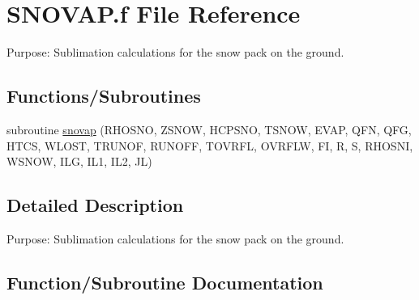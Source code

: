 \hypertarget{SNOVAP_8f}{}\section{S\+N\+O\+V\+A\+P.\+f File Reference}
\label{SNOVAP_8f}


Purpose\+: Sublimation calculations for the snow pack on the ground.  


\subsection*{Functions/\+Subroutines}
\begin{DoxyCompactItemize}
\item 
subroutine \hyperlink{SNOVAP_8f_a64f8b35d4ad3e8ced53867425e4500d3}{snovap} (R\+H\+O\+S\+N\+O, Z\+S\+N\+O\+W, H\+C\+P\+S\+N\+O, T\+S\+N\+O\+W, E\+V\+A\+P, Q\+F\+N, Q\+F\+G, H\+T\+C\+S, W\+L\+O\+S\+T, T\+R\+U\+N\+O\+F, R\+U\+N\+O\+F\+F, T\+O\+V\+R\+F\+L, O\+V\+R\+F\+L\+W, F\+I, R, S, R\+H\+O\+S\+N\+I, W\+S\+N\+O\+W, I\+L\+G, I\+L1, I\+L2, J\+L)
\end{DoxyCompactItemize}


\subsection{Detailed Description}
Purpose\+: Sublimation calculations for the snow pack on the ground. 



\subsection{Function/\+Subroutine Documentation}
\hypertarget{SNOVAP_8f_a64f8b35d4ad3e8ced53867425e4500d3}{}
